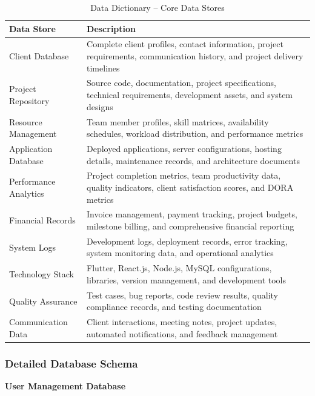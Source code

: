 \documentclass[12pt,a4paper]{article}
\begin{document}
\begin{table}[H]
\centering
\renewcommand{\arraystretch}{1.3}
\begin{tabular}{|p{3.5cm}|p{9.5cm}|}
\hline
\rowcolor{orange!20}
\textbf{Data Store} & \textbf{Description} \\
\hline
Client Database & Complete client profiles, contact information, project requirements, communication history, and project delivery timelines \\
\hline
Project Repository & Source code, documentation, project specifications, technical requirements, development assets, and system designs \\
\hline
Resource Management & Team member profiles, skill matrices, availability schedules, workload distribution, and performance metrics \\
\hline
Application Database & Deployed applications, server configurations, hosting details, maintenance records, and architecture documents \\
\hline
Performance Analytics & Project completion metrics, team productivity data, quality indicators, client satisfaction scores, and DORA metrics \\
\hline
Financial Records & Invoice management, payment tracking, project budgets, milestone billing, and comprehensive financial reporting \\
\hline
System Logs & Development logs, deployment records, error tracking, system monitoring data, and operational analytics \\
\hline
Technology Stack & Flutter, React.js, Node.js, MySQL configurations, libraries, version management, and development tools \\
\hline
Quality Assurance & Test cases, bug reports, code review results, quality compliance records, and testing documentation \\
\hline
Communication Data & Client interactions, meeting notes, project updates, automated notifications, and feedback management \\
\hline
\end{tabular}
\caption{Data Dictionary – Core Data Stores}
\end{table}

\newpage
\subsubsection{Detailed Database Schema}

\vspace{0.3cm}
{\color{orange!80}\large\textbf{User Management Database}}
\end{document}
